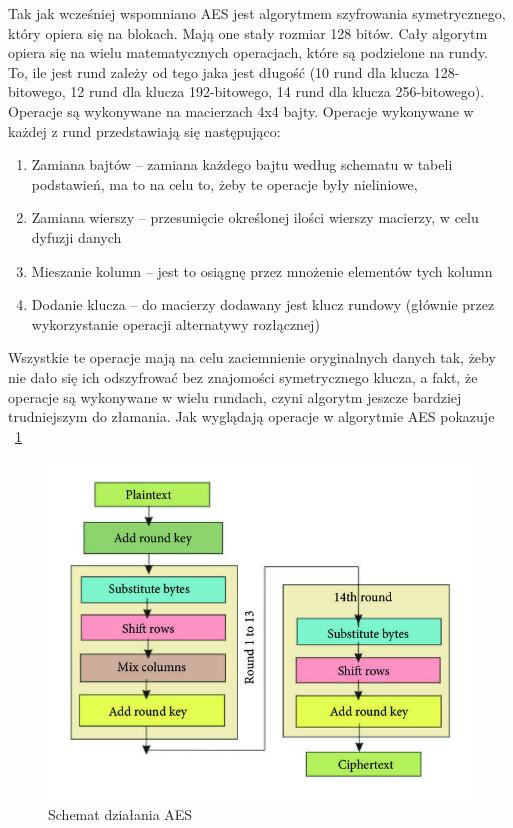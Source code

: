 Tak jak wcześniej wspomniano AES jest algorytmem szyfrowania symetrycznego, który opiera się na blokach. Mają one stały rozmiar 128 bitów. Cały algorytm opiera się na wielu matematycznych operacjach, które są podzielone na rundy. To, ile jest rund zależy od tego jaka jest długość (10 rund dla klucza 128-bitowego, 12 rund dla klucza 192-bitowego, 14 rund dla klucza 256-bitowego). Operacje są wykonywane na macierzach 4x4 bajty.
\newline Operacje wykonywane w każdej z rund przedstawiają się następująco:
\begin{enumerate}
    \item Zamiana bajtów – zamiana każdego bajtu według schematu w tabeli podstawień, ma to na celu to, żeby te operacje były nieliniowe,
    \item Zamiana wierszy – przesunięcie określonej ilości wierszy macierzy, w celu dyfuzji danych
    \item Mieszanie kolumn – jest to osiągnę przez mnożenie elementów tych kolumn
    \item Dodanie klucza – do macierzy dodawany jest klucz rundowy (głównie przez wykorzystanie operacji alternatywy rozłącznej)
\end{enumerate}
Wszystkie te operacje mają na celu zaciemnienie oryginalnych danych tak, żeby nie dało się ich odszyfrować bez znajomości symetrycznego klucza, a fakt, że operacje są wykonywane w wielu rundach, czyni algorytm jeszcze bardziej trudniejszym do złamania.
Jak wyglądają operacje w algorytmie AES pokazuje \figurename{~\ref{fig:AES2}}
\begin{figure}[hb]
    \centering
    \includegraphics[width=0.6\linewidth]{Images/AES2.jpg}
    \caption{Schemat działania AES}
    \label{fig:AES2}
\end{figure}
\clearpage

